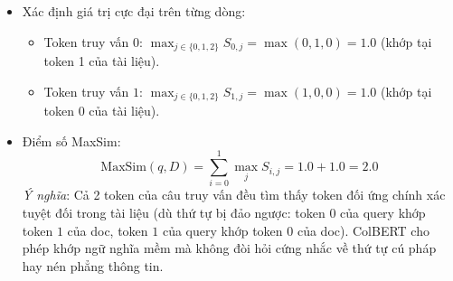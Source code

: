 \begin{itemize}
  \item[b)] Xác định giá trị cực đại trên từng dòng:
  \begin{itemize}
    \item Token truy vấn $0$: $\max_{j \in \{0, 1, 2\}} S_{0, j} = \max(0, 1, 0) = 1.0$ (khớp tại token 1 của tài liệu).
    \item Token truy vấn $1$: $\max_{j \in \{0, 1, 2\}} S_{1, j} = \max(1, 0, 0) = 1.0$ (khớp tại token 0 của tài liệu).
  \end{itemize}

  \item[c)] Điểm số MaxSim:
  \begin{equation*}
  \text{MaxSim}(q, D) = \sum_{i=0}^1 \max_{j} S_{i, j} = 1.0 + 1.0 = \mathbf{2.0}
  \end{equation*}
  \textit{Ý nghĩa}: Cả 2 token của câu truy vấn đều tìm thấy token đối ứng chính xác tuyệt đối trong tài liệu (dù thứ tự bị đảo ngược: token $0$ của query khớp token $1$ của doc, token $1$ của query khớp token $0$ của doc). ColBERT cho phép khớp ngữ nghĩa mềm mà không đòi hỏi cứng nhắc về thứ tự cú pháp hay nén phẳng thông tin.
\end{itemize}

